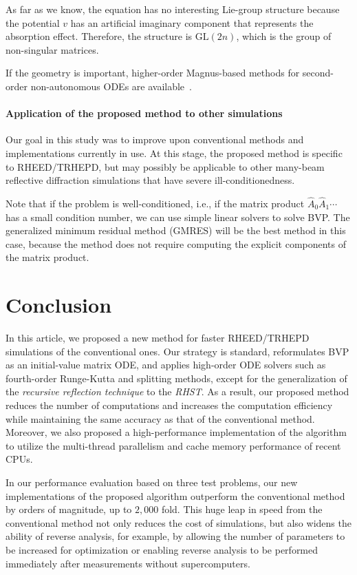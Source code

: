 \documentclass[preprint, 5p, times, sort&compress]{elsarticle}
\begin{document}
        As far as we know, the equation has no interesting Lie-group structure because the potential $v$ has an artificial imaginary component that represents the absorption effect.
        Therefore, the structure is $\mathrm{GL}(2n)$, which is the group of non-singular matrices.

        If the geometry is important,
        higher-order Magnus-based methods for second-order non-autonomous ODEs are available~\cite{bader2018}.

        \paragraph{Application of the proposed method to other simulations}
        Our goal in this study was to improve upon conventional methods and implementations currently in use.
        At this stage, the proposed method is specific to RHEED\slash TRHEPD,
        but may possibly be applicable to other many-beam reflective diffraction simulations
        that have severe ill-conditionedness.

        Note that if the problem is well-conditioned, i.e.,
        if the matrix product $\hat{A}_0\hat{A}_1\cdots$ has a small condition number,
        we can use simple linear solvers to solve BVP.
        The generalized minimum residual method (GMRES) will be the best method in this case,
        because the method does not require computing the explicit components of the matrix product.


        \section{Conclusion}
        In this article, we proposed a new method for faster RHEED\slash TRHEPD simulations 
        of the conventional ones.
        Our strategy is standard, reformulates BVP as an initial-value matrix ODE,
        and applies high-order ODE solvers such as fourth-order Runge-Kutta and splitting methods,
        except for the generalization of the \emph{recursive reflection technique} to the \emph{RHST}.
        As a result, our proposed method reduces the number of computations and
        increases the computation efficiency while maintaining the same accuracy as that of the conventional method.
        Moreover, we also proposed a high-performance implementation of the algorithm to
        utilize the multi-thread parallelism and cache memory performance of recent CPUs.

        In our performance evaluation based on three test problems,
        our new implementations of the proposed algorithm outperform the conventional method
        by orders of magnitude, up to $2,000$ fold.
        This huge leap in speed from the conventional method not only reduces the cost of simulations,
        but also widens the ability of reverse analysis, for example, by allowing the number of parameters to be increased for optimization
        or enabling reverse analysis to be performed immediately after measurements without supercomputers.
\end{document}
